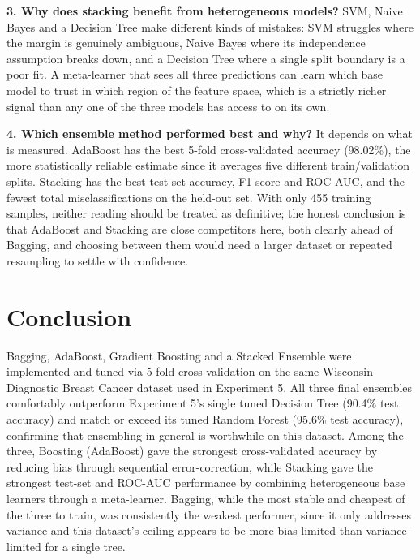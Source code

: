 \documentclass[12pt,a4paper]{article}
\begin{document}
\textbf{3. Why does stacking benefit from heterogeneous models?} SVM, Naive Bayes and a
Decision Tree make different kinds of mistakes: SVM struggles where the margin is genuinely
ambiguous, Naive Bayes where its independence assumption breaks down, and a Decision Tree
where a single split boundary is a poor fit. A meta-learner that sees all three predictions
can learn which base model to trust in which region of the feature space, which is a strictly
richer signal than any one of the three models has access to on its own.

\textbf{4. Which ensemble method performed best and why?} It depends on what is measured.
AdaBoost has the best 5-fold cross-validated accuracy (98.02\%), the more statistically
reliable estimate since it averages five different train/validation splits. Stacking has the
best test-set accuracy, F1-score and ROC-AUC, and the fewest total misclassifications on the
held-out set. With only 455 training samples, neither reading should be treated as
definitive; the honest conclusion is that AdaBoost and Stacking are close competitors here,
both clearly ahead of Bagging, and choosing between them would need a larger dataset or
repeated resampling to settle with confidence.

\section{Conclusion}
Bagging, AdaBoost, Gradient Boosting and a Stacked Ensemble were implemented and tuned via
5-fold cross-validation on the same Wisconsin Diagnostic Breast Cancer dataset used in
Experiment 5. All three final ensembles comfortably outperform Experiment 5's single tuned
Decision Tree (90.4\% test accuracy) and match or exceed its tuned Random Forest (95.6\% test
accuracy), confirming that ensembling in general is worthwhile on this dataset. Among the
three, Boosting (AdaBoost) gave the strongest cross-validated accuracy by reducing bias
through sequential error-correction, while Stacking gave the strongest test-set and ROC-AUC
performance by combining heterogeneous base learners through a meta-learner. Bagging, while
the most stable and cheapest of the three to train, was consistently the weakest performer,
since it only addresses variance and this dataset's ceiling appears to be more bias-limited
than variance-limited for a single tree.
\end{document}
